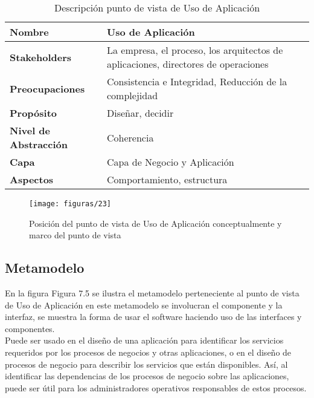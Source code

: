   \begin{table}[H]
  	\centering
  	\begin{tabular}{p{3.7cm}p{8cm}}
  		\hline
  		\rowcolor[HTML]{0073a1}
  		{\color[HTML]{FFFFFF} \textbf{Nombre}} & {\color[HTML]{FFFFFF} \textbf{Uso de Aplicación}} \\
  		\hline
  		\textbf{Stakeholders} & La empresa, el proceso, los arquitectos de aplicaciones, directores de operaciones \\
  		\textbf{Preocupaciones} & Consistencia e Integridad, Reducción de la complejidad \\
  		\textbf{Propósito} & Diseñar, decidir \\
  		\textbf{Nivel de Abstracción} & Coherencia \\
  		\textbf{Capa} & Capa de Negocio y Aplicación \\
  		\textbf{Aspectos} & Comportamiento, estructura \\
  		\bottomrule
  	\end{tabular}
  	\captionsetup{width=.95\textwidth}
  	\caption{Descripción punto de vista de Uso de Aplicación}
  	\label{tabla13}
  \end{table}
  
  \begin{figure}[H]
  	\centering
  	\texttt{[image: figuras/23]}
  	\captionsetup{width=.95\textwidth}
  	\caption{Posición del punto de vista de Uso de Aplicación conceptualmente y marco del punto de vista}
  	\label{figura23}
  \end{figure}
  
  \subsection{Metamodelo}
  En la figura Figura 7.5 se ilustra el metamodelo perteneciente al punto de vista de Uso de Aplicación en este metamodelo se involucran el componente y la interfaz, se muestra la forma de usar el software haciendo uso de las interfaces y componentes. \\
  
  Puede ser usado en el diseño de una aplicación para identificar los servicios requeridos por los procesos de negocios y otras aplicaciones, o en el diseño de procesos de negocio para describir los servicios que están disponibles. Así, al identificar las dependencias de los procesos de negocio sobre las aplicaciones, puede ser útil para los administradores operativos responsables de estos procesos.
  

